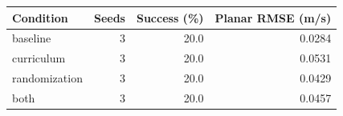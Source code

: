 \begin{tabular}{lrrr}\toprule
Condition & Seeds & Success (\%) & Planar RMSE (m/s)\\\midrule
baseline & 3 & 20.0 & 0.0284\\
curriculum & 3 & 20.0 & 0.0531\\
randomization & 3 & 20.0 & 0.0429\\
both & 3 & 20.0 & 0.0457\\
\bottomrule\end{tabular}
